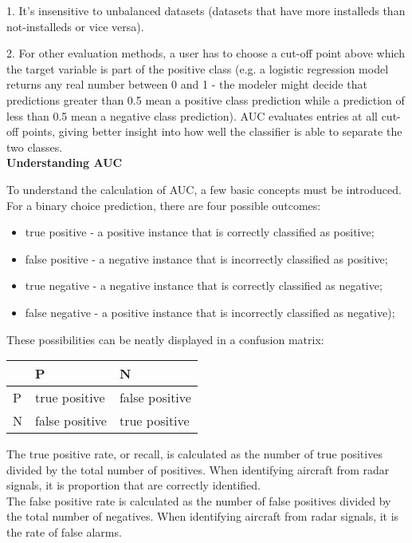 \documentclass[11pt]{article}
\begin{document}
\begin{singlespacing}
1. It's insensitive to unbalanced datasets (datasets that have more installeds than not-installeds or vice versa).

2. For other evaluation methods, a user has to choose a cut-off point above which the target variable is part of the positive class (e.g. a logistic regression model returns any real number between 0 and 1 - the modeler might decide that predictions greater than 0.5 mean a positive class prediction while a prediction of less than 0.5 mean a negative class prediction). AUC evaluates entries at all cut-off points, giving better insight into how well the classifier is able to separate the two classes. \\

\textbf{Understanding AUC}

To understand the calculation of AUC, a few basic concepts must be introduced. For a binary choice prediction, there are four possible outcomes:\\
\begin{itemize}
\item true positive - a positive instance that is correctly classified as positive;
\item false positive - a negative instance that is incorrectly classified as positive;
\item true negative - a negative instance that is correctly classified as negative;
\item false negative - a positive instance that is incorrectly classified as negative);
\end{itemize}

These possibilities can be neatly displayed in a confusion matrix:

\begin{center}
\begin{tabular}{|l|l|l|}
\hline
  & P             & N \\ \hline
P & true positive & false positive \\ \hline
N & false positive & true positive \\
\hline
\end{tabular}
\end{center}

The true positive rate, or recall, is calculated as the number of true positives divided by the total number of positives. When identifying aircraft from radar signals, it is proportion that are correctly identified.\\

The false positive rate is calculated as the number of false positives divided by the total number of negatives. When identifying aircraft from radar signals, it is the rate of false alarms.



\end{singlespacing}
\end{document}
